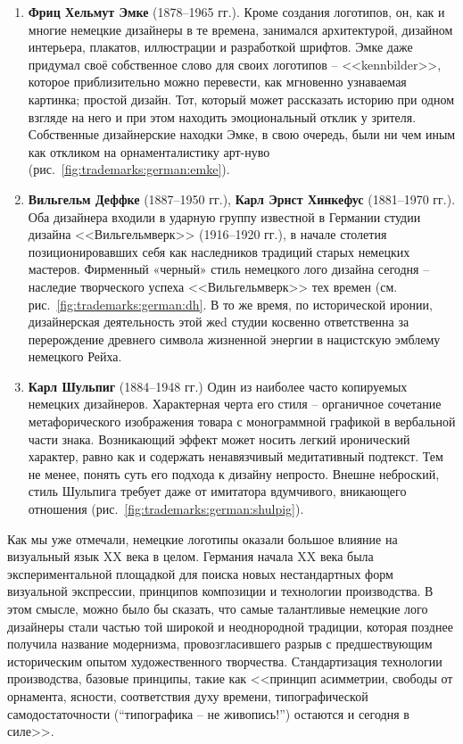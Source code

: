 \begin{enumerate}
\item \textbf{Фриц Хельмут Эмке} (1878--1965 гг.). Кроме создания логотипов, он, как и многие
  немецкие дизайнеры в те времена, занимался архитектурой, дизайном интерьера, плакатов, иллюстрации
  и разработкой шрифтов. Эмке даже придумал своё собственное слово для своих логотипов --
  <<kennbilder>>, которое приблизительно можно перевести, как мгновенно узнаваемая картинка; простой
  дизайн. Тот, который может рассказать историю при одном взгляде на него и при этом находить
  эмоциональный отклик у зрителя. Собственные дизайнерские находки Эмке, в свою очередь, были ни чем
  иным как откликом на орнаменталистику арт-нуво (рис.~\ref{fig:trademarks:german:emke}).
\item \textbf{Вильгельм Деффке} (1887--1950 гг.), \textbf{Карл Эрнст Хинкефус} (1881--1970 гг.). Оба
  дизайнера входили в ударную группу известной в Германии студии дизайна <<Вильгельмверк>> (1916--1920
  гг.), в начале столетия позиционировавших себя как наследников традиций старых немецких
  мастеров. Фирменный «черный» стиль немецкого лого дизайна сегодня -- наследие творческого успеха
  <<Вильгельмверк>> тех времен (см. рис.~\ref{fig:trademarks:german:dh}. В то же время, по
  исторической иронии, дизайнерская деятельность этой жеd студии косвенно ответственна за перерождение
  древнего символа жизненной энергии в нацистскую эмблему немецкого Рейха.
\item \textbf{Карл Шульпиг} (1884--1948 гг.) Один из наиболее часто копируемых немецких
  дизайнеров. Характерная черта его стиля -- органичное сочетание метафорического изображения товара
  с монограммной графикой в вербальной части знака. Возникающий эффект может носить легкий
  иронический характер, равно как и содержать ненавязчивый медитативный подтекст. Тем не менее,
  понять суть его подхода к дизайну непросто. Внешне неброский, стиль Шульпига требует даже от
  имитатора вдумчивого, вникающего отношения (рис.~\ref{fig:trademarks:german:shulpig}).
\end{enumerate}

Как мы уже отмечали, немецкие логотипы оказали большое влияние на визуальный язык XX века в целом. Германия начала XX века была экспериментальной площадкой для поиска новых нестандартных форм визуальной экспрессии,
принципов композиции и технологии производства. В этом смысле, можно было бы сказать, что самые
талантливые немецкие лого дизайнеры стали частью той широкой и неоднородной традиции, которая
позднее получила название модернизма, провозгласившего разрыв с предшествующим историческим опытом
художественного творчества. Стандартизация технологии производства, базовые принципы, такие как
<<принцип асимметрии, свободы от орнамента, ясности, соответствия духу времени, типографической
самодостаточности (``типографика – не живопись!'') остаются и сегодня в силе>>.\autocite[][8]{chihold2011}

